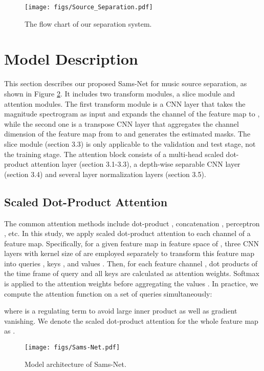 \documentclass[a4paper]{article}
\begin{document}
\begin{figure}[h]
\centering
\texttt{[image: figs/Source\_Separation.pdf]}
\caption{The flow chart of our separation system.}
\label{fig:source_separation}
\end{figure}

\section{Model Description}

This section describes our proposed Sams-Net for music source separation, as shown in Figure \ref{fig:sams_net}. It includes two transform modules, a slice module and  attention modules. The first transform module is a CNN layer that takes the magnitude spectrogram as input and expands the channel of the feature map to , while the second one is a transpose CNN layer that aggregates the channel dimension of the feature map from  to  and generates the estimated masks. The slice module (section 3.3) is only applicable to the validation and test stage, not the training stage. The attention block consists of a multi-head scaled dot-product attention layer (section 3.1-3.3), a depth-wise separable CNN layer (section 3.4) and several layer normalization layers (section 3.5).

\subsection{Scaled Dot-Product Attention}

The common attention methods include dot-product \cite{vaswani2017attention}, concatenation \cite{anderson2018bottom}, perceptron \cite{oktay2018attention}, etc. In this study, we apply scaled dot-product attention to each channel of a feature map. Specifically, for a given feature map in feature space of , three CNN layers with kernel size of  are employed separately to transform this feature map into queries , keys , and values . Then, for each feature channel , dot products of the  time frame of query  and all keys  are calculated as attention weights. Softmax is applied to the attention weights before aggregating the values . In practice, we compute the attention function on a set of queries  simultaneously:

where  is a regulating term to avoid large inner product as well as gradient vanishing. We denote the scaled dot-product attention for the whole feature map as .

\begin{figure}[tb]
  \centering
  \texttt{[image: figs/Sams-Net.pdf]}
  \caption{Model architecture of Sams-Net.}
  \label{fig:sams_net}
\end{figure}
\end{document}
